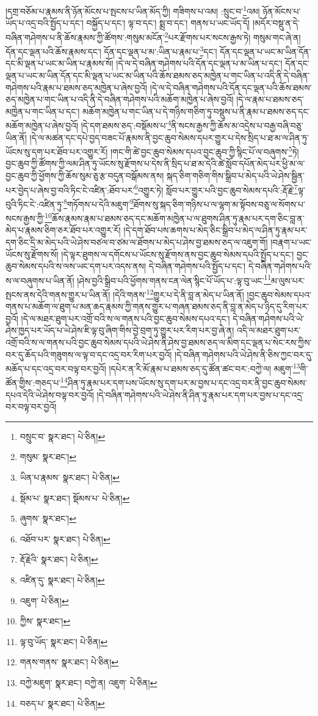 །དགྲ་བཅོམ་པ་རྣམས་ནི་ཉོན་མོངས་པ་སྤངས་པ་ཡིན་མོད་ཀྱི། གཟིགས་པ་འམ། :སྲུང་བ་\footnote{བསྲུང་བ་  སྣར་ཐང་།  པེ་ཅིན། }འམ། ཉོན་མོངས་པ་ཡོད་པ་འདྲ་བའི་སྤྱོད་པ་དང་། བསྐྱོད་པ་དང་། ལྟ་བ་དང་། སྨྲ་བ་དང་། གནས་པ་ཡང་ཡོད་དོ། །མདོར་བསྡུ་ན་དེ་བཞིན་གཤེགས་པ་ནི་ཆོས་རྣམས་ཀྱི་ཚོགས་:གསུམ་མངོན་\footnote{གསུམ་  སྣར་ཐང་། }པར་རྫོགས་པར་སངས་རྒྱས་ཏེ། གསུམ་གང་ཞེ་ན། དོན་དང་ལྡན་པའི་ཆོས་རྣམས་དང་། དོན་དང་ལྡན་པ་མ་:ཡིན་པ་རྣམ་པ་\footnote{ཡིན་པ་རྣམས་  སྣར་ཐང་།  པེ་ཅིན། }དང་། དོན་དང་ལྡན་པ་ཡང་མ་ཡིན་དོན་དང་མི་ལྡན་པ་ཡང་མ་ཡིན་པ་རྣམས་སོ། །དེ་ལ་དེ་བཞིན་གཤེགས་པའི་དོན་དང་ལྡན་པ་མ་ཡིན་པ་དང་། དོན་དང་ལྡན་པ་ཡང་མ་ཡིན་དོན་དང་མི་ལྡན་པ་ཡང་མ་ཡིན་པའི་ཆོས་ཐམས་ཅད་མཁྱེན་པ་གང་ཡིན་པ་འདི་ནི་དེ་བཞིན་གཤེགས་པའི་རྣམ་པ་ཐམས་ཅད་མཁྱེན་པ་ཞེས་བྱའོ། །དེ་ལ་དེ་བཞིན་གཤེགས་པའི་དོན་དང་ལྡན་པའི་ཆོས་ཐམས་ཅད་མཁྱེན་པ་གང་ཡིན་པ་འདི་ནི་དེ་བཞིན་གཤེགས་པའི་མཆོག་མཁྱེན་པ་ཞེས་བྱའོ། །དེ་ལ་རྣམ་པ་ཐམས་ཅད་མཁྱེན་པ་གང་ཡིན་པ་དང་། མཆོག་མཁྱེན་པ་གང་ཡིན་པ་དེ་གཉིས་གཅིག་ཏུ་བསྡུས་པ་ནི་རྣམ་པ་ཐམས་ཅད་དང་མཆོག་མཁྱེན་པ་ཞེས་བྱའོ། །དེ་དག་ཐམས་ཅད་:བསྡོམས་པ་\footnote{སྡོམ་པ་  སྣར་ཐང་། སྡོམས་པ་  པེ་ཅིན། }ནི་སངས་རྒྱས་ཀྱི་ཆོས་མ་འདྲེས་པ་བརྒྱ་བཞི་བཅུ་ཡིན་ནོ། །དེ་ལ་མཚན་དང་དཔེ་བྱད་བཟང་པོ་རྣམས་ནི་བྱང་ཆུབ་སེམས་དཔར་གྱུར་པ་དེས་སྲིད་པ་ཐ་མ་ལ་ཤིན་ཏུ་ཡོངས་སུ་དག་པར་ཐོབ་པར་འགྱུར་རོ། །གང་གི་ཚེ་བྱང་ཆུབ་སེམས་དཔའ་བྱང་ཆུབ་ཀྱི་སྙིང་པོ་ལ་བཞུགས་\footnote{ཞུགས་  སྣར་ཐང་། }ཏེ། བྱང་ཆུབ་ཀྱི་ཚོགས་ཀྱི་ལམ་ཤིན་ཏུ་ཡོངས་སུ་རྫོགས་པ་དེས་ནི་སྲིད་པ་ཐ་མ་དེའི་ཚེ་སློབ་དཔོན་མེད་པར་ཕྱི་མ་ལ་བྱང་ཆུབ་ཀྱི་ཕྱོགས་ཀྱི་ཆོས་སུམ་ཅུ་རྩ་བདུན་བསྒོམས་ནས། སྐད་ཅིག་གཅིག་གིས་སྒྲིབ་པ་མེད་པའི་ཡེ་ཤེས་སྦྱིན་པར་བྱེད་པ་ཞེས་བྱ་བའི་ཏིང་ངེ་འཛིན་:ཐོབ་པར་\footnote{འཐོབ་པར་  སྣར་ཐང་།  པེ་ཅིན། }འགྱུར་ཏེ། སློབ་པར་གྱུར་པའི་བྱང་ཆུབ་སེམས་དཔའི་:རྡོ་རྗེ་\footnote{རྡོ་རྗེའི་  སྣར་ཐང་།  པེ་ཅིན། }ལྟ་བུའི་ཏིང་ངེ་:འཛིན་ཏུ་\footnote{འཛིན་དུ་  སྣར་ཐང་།  པེ་ཅིན། }གཏོགས་པ་དེའི་མཇུག་\footnote{འཇུག་  པེ་ཅིན། }ཐོགས་སུ་སྐད་ཅིག་གཉིས་པ་ལ་ལྷག་མ་སྟོབས་བཅུ་ལ་སོགས་པ་སངས་རྒྱས་ཀྱི་\footnote{ཀྱིས་  སྣར་ཐང་། }ཆོས་རྣམས་རྣམ་པ་ཐམས་ཅད་དང་མཆོག་མཁྱེན་པ་ལ་ཐུགས་ཤིན་ཏུ་རྣམ་པར་དག་ཅིང་བླ་ན་མེད་པ་རྣམས་ཅིག་ཅར་ཐོབ་པར་འགྱུར་རོ། །དེ་དག་ཐོབ་པས་ཆགས་པ་མེད་ཅིང་སྒྲིབ་པ་མེད་ལ་ཤིན་ཏུ་རྣམ་པར་དག་ཅིང་དྲི་མ་མེད་པའི་ཡེ་ཤེས་བཙལ་བ་ཙམ་ལ་ཐོགས་པ་མེད་པ་ཤེས་བྱ་ཐམས་ཅད་ལ་འཇུག་གོ། །བརྣག་པ་ཡང་ཡོངས་སུ་རྫོགས་སོ། །དེ་ལྟར་ཐུགས་ལ་དགོངས་པ་ཡོངས་སུ་རྫོགས་ནས་བྱང་ཆུབ་སེམས་དཔའི་སྤྱོད་པ་དང་། བྱང་ཆུབ་སེམས་དཔའི་ས་ལས་ཡང་དག་པར་འདས་ནས། དེ་བཞིན་གཤེགས་པའི་སྤྱོད་པ་དང་། དེ་བཞིན་གཤེགས་པའི་ས་ལ་བཞུགས་པ་ཡིན་ནོ། །ཤེས་བྱའི་སྒྲིབ་པའི་ཕྱོགས་གནས་ངན་ལེན་སྙིང་པོ་ཡོད་པ་:ལྟ་བུ་ཡང་\footnote{ལྟ་བུ་ཡོད་  སྣར་ཐང་།  པེ་ཅིན། }མ་ལུས་པར་སྤངས་ནས་དེའི་གནས་གྱུར་པ་ཡིན་ནོ། །དེའི་གནས་\footnote{གནས་གནས་  སྣར་ཐང་།  པེ་ཅིན། }གྱུར་པ་དེ་ནི་བླ་ན་མེད་པ་ཡིན་ནོ། །བྱང་ཆུབ་སེམས་དཔའ་གནས་པ་མཆོག་ལ་ཐུག་པ་མན་ཆད་རྣམས་ཀྱི་གནས་གྱུར་པ་གཞན་ཐམས་ཅད་ནི་བླ་ན་མེད་པ་ཉིད་དུ་རིག་པར་བྱའོ། །དེ་ལ་མཐར་ཐུག་པར་འགྲོ་བའི་ས་ལ་གནས་པའི་བྱང་ཆུབ་སེམས་དཔའ་དང་། དེ་བཞིན་གཤེགས་པའི་ཡེ་ཤེས་ཁྱད་པར་ཡོད་པ་ཡེ་ཤེས་ཇི་ལྟ་བུ་ཞིག་གིས་བྱེ་བྲག་ཏུ་གྱུར་པར་རིག་པར་བྱ་ཞེ་ན། འདི་ལ་མཐར་ཐུག་པར་འགྲོ་བའི་ས་ལ་གནས་པའི་བྱང་ཆུབ་སེམས་དཔའི་ཡེ་ཤེས་ནི་ཤེས་བྱ་ཐམས་ཅད་ལ་མིག་དང་ལྡན་པ་སེང་རས་ཀྱིས་བར་དུ་ཆོད་པའི་གཟུགས་ལ་ལྟ་བ་དང་འདྲ་བར་རིག་པར་བྱའོ། །དེ་བཞིན་གཤེགས་པའི་ཡེ་ཤེས་ནི་ཅིས་ཀྱང་བར་དུ་མཆོད་པ་དང་འདྲ་བར་བལྟ་བར་བྱའོ། །དཔེར་ན་རི་མོ་རྣམ་པ་ཐམས་ཅད་དུ་ཚོན་ཚང་བར་:བཀྱེ་ལ། མཇུག་\footnote{བཀྱེ་མཇུག་  སྣར་ཐང་། བཀྱེ་ན། འཇུག་  པེ་ཅིན། }གི་ཚོན་གྱིས་:གཅད་པ་\footnote{བཅད་པ་  སྣར་ཐང་།  པེ་ཅིན། }ཤིན་ཏུ་རྣམ་པར་དག་པས་ཡོངས་སུ་དག་པར་མ་བྱས་པ་དང་འདྲ་བར་ནི་བྱང་ཆུབ་སེམས་དཔའ་དེའི་ཡེ་ཤེས་བལྟ་བར་བྱའོ། །དེ་བཞིན་གཤེགས་པའི་ཡེ་ཤེས་ནི་ཤིན་ཏུ་རྣམ་པར་དག་པར་བྱས་པ་དང་འདྲ་བར་བལྟ་བར་བྱའོ། 